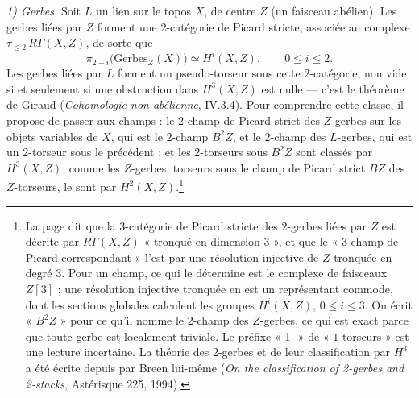\documentclass[11pt,a4paper]{article}
\begin{document}
\emph{1) Gerbes.} Soit $L$ un lien sur le topos $X$, de centre $Z$ (un
faisceau abélien). Les gerbes liées par $Z$ forment une $2$-catégorie de
Picard stricte, associée au complexe $\tau_{\leqslant 2}\,R\Gamma(X,Z)$, de
sorte que
\[
\pi_{2-i}\bigl(\mathrm{Gerbes}_Z(X)\bigr) \simeq H^i(X,Z), \qquad 0 \leqslant i \leqslant 2 .
\]
Les gerbes liées par $L$ forment un pseudo-torseur sous cette
$2$-catégorie, non vide si et seulement si une obstruction dans $H^3(X,Z)$
est nulle --- c'est le théorème de Giraud (\emph{Cohomologie non
abélienne}, IV.3.4). Pour comprendre cette classe, il propose de passer aux
champs : le $2$-champ de Picard strict des $Z$-gerbes sur les objets
variables de $X$, qui est le $2$-champ $B^2Z$, et le $2$-champ des
$L$-gerbes, qui est un $2$-torseur sous le précédent ; et les $2$-torseurs
sous $B^2Z$ sont classés par $H^3(X,Z)$, comme les $Z$-gerbes, torseurs sous
le champ de Picard strict $BZ$ des $Z$-torseurs, le sont par
$H^2(X,Z)$.\footnote{La page dit que la $3$-catégorie de Picard stricte des
$2$-gerbes liées par $Z$ est décrite par $R\Gamma(X,Z)$ « tronqué en
dimension 3 », et que le « $3$-champ de Picard correspondant » l'est par une
résolution injective de $Z$ tronquée en degré 3. Pour un champ, ce qui le
détermine est le complexe de faisceaux $Z[3]$ ; une résolution injective
tronquée en est un représentant commode, dont les sections globales
calculent les groupes $H^i(X,Z)$, $0 \leqslant i \leqslant 3$. On écrit
« $B^2Z$ » pour ce qu'il nomme le $2$-champ des $Z$-gerbes, ce qui est
exact parce que toute gerbe est localement triviale. Le préfixe « 1- » de
« $1$-torseurs » est une lecture incertaine. La théorie des $2$-gerbes et de
leur classification par $H^3$ a été écrite depuis par Breen lui-même
(\emph{On the classification of 2-gerbes and 2-stacks}, Astérisque 225,
1994).}
\end{document}
